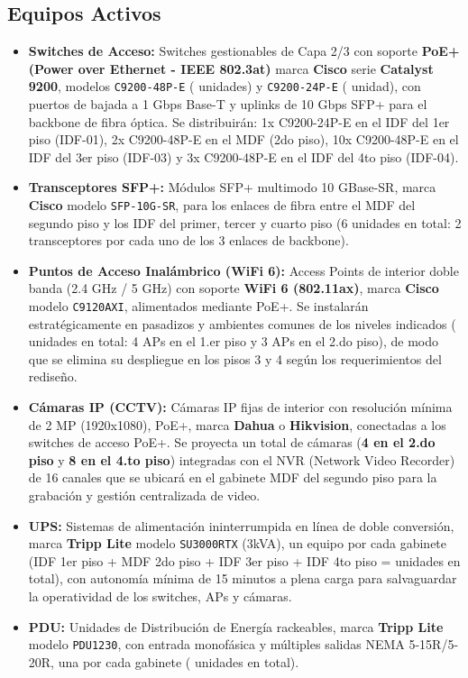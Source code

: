 \subsection*{Equipos Activos}

\begin{itemize}
    \item \textbf{Switches de Acceso:} Switches gestionables de Capa 2/3 con soporte \textbf{PoE+ (Power over Ethernet - IEEE 802.3at)} marca \textbf{Cisco} serie \textbf{Catalyst 9200}, modelos \texttt{C9200-48P-E} (\totalSwitchesCuarentaYOcho{} unidades) y \texttt{C9200-24P-E} (\totalSwitchesVeinticuatro{} unidad), con puertos de bajada a 1 Gbps Base-T y uplinks de 10 Gbps SFP+ para el backbone de fibra óptica. Se distribuirán: 1x C9200-24P-E en el IDF del 1er piso (IDF-01), 2x C9200-48P-E en el MDF (2do piso), 10x C9200-48P-E en el IDF del 3er piso (IDF-03) y 3x C9200-48P-E en el IDF del 4to piso (IDF-04).
    \item \textbf{Transceptores SFP+:} Módulos SFP+ multimodo 10 GBase-SR, marca \textbf{Cisco} modelo \texttt{SFP-10G-SR}, para los enlaces de fibra entre el MDF del segundo piso y los IDF del primer, tercer y cuarto piso (6 unidades en total: 2 transceptores por cada uno de los 3 enlaces de backbone).
    \item \textbf{Puntos de Acceso Inalámbrico (WiFi 6):} Access Points de interior doble banda (2.4 GHz / 5 GHz) con soporte \textbf{WiFi 6 (802.11ax)}, marca \textbf{Cisco} modelo \texttt{C9120AXI}, alimentados mediante PoE+. Se instalarán estratégicamente en pasadizos y ambientes comunes de los niveles indicados (\totalAP{} unidades en total: 4 APs en el 1.er piso y 3 APs en el 2.do piso), de modo que se elimina su despliegue en los pisos 3 y 4 según los requerimientos del rediseño.
    \item \textbf{Cámaras IP (CCTV):} Cámaras IP fijas de interior con resolución mínima de 2 MP (1920x1080), PoE+, marca \textbf{Dahua} o \textbf{Hikvision}, conectadas a los switches de acceso PoE+. Se proyecta un total de \totalCamaras{} cámaras (\textbf{4 en el 2.do piso} y \textbf{8 en el 4.to piso}) integradas con el NVR (Network Video Recorder) de 16 canales que se ubicará en el gabinete MDF del segundo piso para la grabación y gestión centralizada de video.
    \item \textbf{UPS:} Sistemas de alimentación ininterrumpida en línea de doble conversión, marca \textbf{Tripp Lite} modelo \texttt{SU3000RTX} (3kVA), un equipo por cada gabinete (IDF 1er piso + MDF 2do piso + IDF 3er piso + IDF 4to piso = \totalUPS{} unidades en total), con autonomía mínima de 15 minutos a plena carga para salvaguardar la operatividad de los switches, APs y cámaras.
    \item \textbf{PDU:} Unidades de Distribución de Energía rackeables, marca \textbf{Tripp Lite} modelo \texttt{PDU1230}, con entrada monofásica y múltiples salidas NEMA 5-15R/5-20R, una por cada gabinete (\totalPDU{} unidades en total).
\end{itemize}

